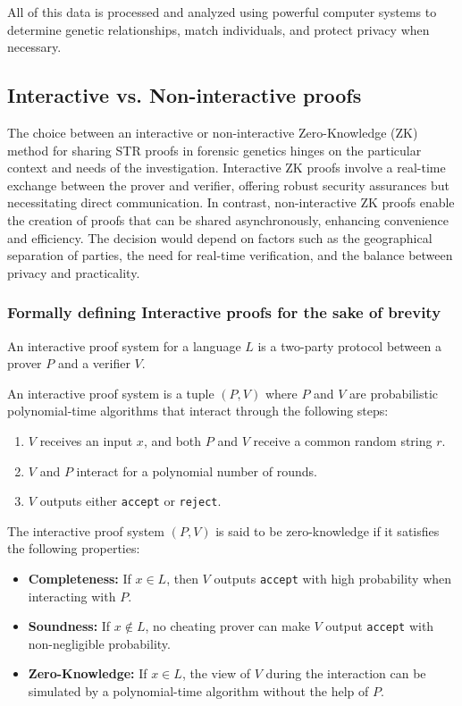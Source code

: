 \documentclass{article}
\begin{document}
All of this data is processed and analyzed using powerful computer systems to determine genetic relationships, match individuals, and protect privacy when necessary.


\subsection{Interactive vs. Non-interactive proofs}
The choice between an interactive or non-interactive Zero-Knowledge (ZK) method for sharing STR proofs in forensic genetics hinges on the particular context and needs of the investigation. Interactive ZK proofs involve a real-time exchange between the prover and verifier, offering robust security assurances but necessitating direct communication. In contrast, non-interactive ZK proofs enable the creation of proofs that can be shared asynchronously, enhancing convenience and efficiency. The decision would depend on factors such as the geographical separation of parties, the need for real-time verification, and the balance between privacy and practicality. 


\subsubsection{Formally defining Interactive proofs for the sake of brevity}


An interactive proof system for a language \(L\) is a two-party protocol between a prover \(P\) and a verifier \(V\).

An interactive proof system is a tuple \((P, V)\) where \(P\) and \(V\) are probabilistic polynomial-time algorithms that interact through the following steps:

\begin{enumerate}
    \item \(V\) receives an input \(x\), and both \(P\) and \(V\) receive a common random string \(r\).
    \item \(V\) and \(P\) interact for a polynomial number of rounds.
    \item \(V\) outputs either \texttt{accept} or \texttt{reject}.
\end{enumerate}

The interactive proof system \((P, V)\) is said to be zero-knowledge if it satisfies the following properties:

\begin{itemize}
    \item \textbf{Completeness:} If \(x \in L\), then \(V\) outputs \texttt{accept} with high probability when interacting with \(P\).
    \item \textbf{Soundness:} If \(x \notin L\), no cheating prover can make \(V\) output \texttt{accept} with non-negligible probability.
    \item \textbf{Zero-Knowledge:} If \(x \in L\), the view of \(V\) during the interaction can be simulated by a polynomial-time algorithm without the help of \(P\).
\end{itemize}
\end{document}

